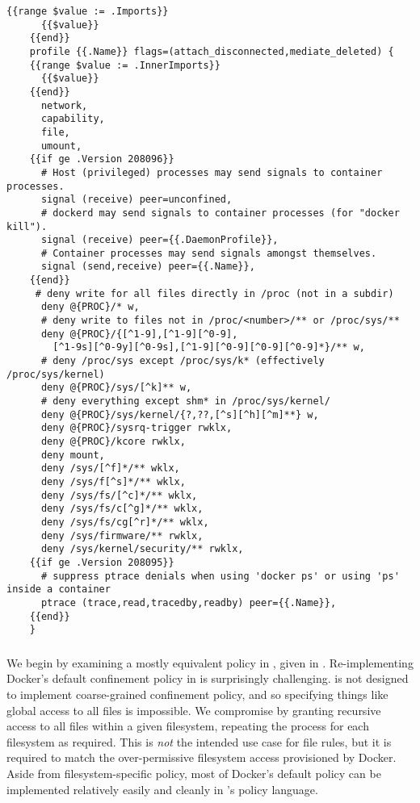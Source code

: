 \begin{lstlisting}[language=none, gobble=4,
  caption={[Docker's default AppArmor template]
    Docker's default AppArmor template~\cite{docker_default_apparmor}, at the time of
    writing this thesis. Docker uses Go's string templating syntax to modify the AppArmor
    profile according to the current Docker version and container metadata.
  },
  label={lst:docker-default}, float]
    {{range $value := .Imports}}
      {{$value}}
    {{end}}
    profile {{.Name}} flags=(attach_disconnected,mediate_deleted) {
    {{range $value := .InnerImports}}
      {{$value}}
    {{end}}
      network,
      capability,
      file,
      umount,
    {{if ge .Version 208096}}
      # Host (privileged) processes may send signals to container processes.
      signal (receive) peer=unconfined,
      # dockerd may send signals to container processes (for "docker kill").
      signal (receive) peer={{.DaemonProfile}},
      # Container processes may send signals amongst themselves.
      signal (send,receive) peer={{.Name}},
    {{end}}
     # deny write for all files directly in /proc (not in a subdir)
      deny @{PROC}/* w,
      # deny write to files not in /proc/<number>/** or /proc/sys/**
      deny @{PROC}/{[^1-9],[^1-9][^0-9],
        [^1-9s][^0-9y][^0-9s],[^1-9][^0-9][^0-9][^0-9]*}/** w,
      # deny /proc/sys except /proc/sys/k* (effectively /proc/sys/kernel)
      deny @{PROC}/sys/[^k]** w,
      # deny everything except shm* in /proc/sys/kernel/
      deny @{PROC}/sys/kernel/{?,??,[^s][^h][^m]**} w,
      deny @{PROC}/sysrq-trigger rwklx,
      deny @{PROC}/kcore rwklx,
      deny mount,
      deny /sys/[^f]*/** wklx,
      deny /sys/f[^s]*/** wklx,
      deny /sys/fs/[^c]*/** wklx,
      deny /sys/fs/c[^g]*/** wklx,
      deny /sys/fs/cg[^r]*/** wklx,
      deny /sys/firmware/** rwklx,
      deny /sys/kernel/security/** rwklx,
    {{if ge .Version 208095}}
      # suppress ptrace denials when using 'docker ps' or using 'ps' inside a container
      ptrace (trace,read,tracedby,readby) peer={{.Name}},
    {{end}}
    }
\end{lstlisting}

\subsubsection{\bpfbox{}}

We begin by examining a mostly equivalent policy in \bpfbox{}, given in
.  Re-implementing Docker's default confinement policy in
\bpfbox{} is surprisingly challenging. \bpfbox{} is not designed to implement
coarse-grained confinement policy, and so specifying things like global access to all
files is impossible. We compromise by granting recursive access to all files within
a given filesystem, repeating the process for each filesystem as required. This is
\textit{not} the intended use case for \bpfbox{} file rules, but it is required to match
the over-permissive filesystem access provisioned by Docker. Aside from
filesystem-specific policy, most of Docker's default policy can be implemented relatively
easily and cleanly in \bpfbox{}'s policy language.


